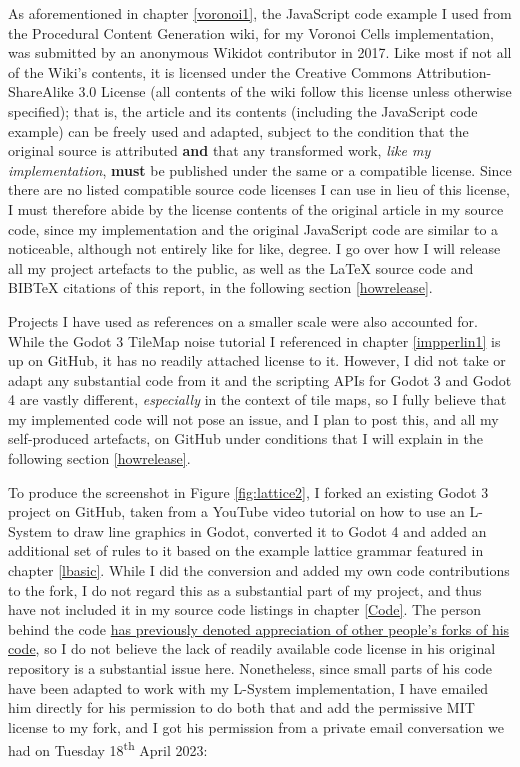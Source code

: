 As aforementioned in chapter \ref{voronoi1}, the JavaScript code example I used from the Procedural Content Generation wiki\cite{pcgwikivoronoi}, for my Voronoi Cells implementation, was submitted by an anonymous Wikidot contributor in 2017. Like most if not all of the Wiki's contents, it is licensed under the Creative Commons Attribution-ShareAlike 3.0 License (all contents of the wiki follow this license unless otherwise specified); that is, the article and its contents (including the JavaScript code example) can be freely used and adapted, subject to the condition that the original source is attributed \textbf{and} that any transformed work, \textit{like my implementation}, \textbf{must} be published under the same or a compatible license.\cite{cc_at_sa_3} Since there are no listed compatible source code licenses I can use in lieu of this license\cite{cc_compat}, I must therefore abide by the license contents of the original article in my source code, since my implementation and the original JavaScript code are similar to a noticeable, although not entirely like for like, degree. I go over how I will release all my project artefacts to the public, as well as the \LaTeX{} source code and BIB\TeX{} citations of this report, in the following section \ref{howrelease}.

Projects I have used as references on a smaller scale were also accounted for. While the Godot 3 TileMap noise tutorial I referenced in chapter \ref{impperlin1} is up on GitHub, it has no readily attached license to it.\cite{gingergd3tutorialGH} However, I did not take or adapt any substantial code from it and the scripting APIs for Godot 3 and Godot 4 are vastly different, \textit{especially} in the context of tile maps, so I fully believe that my implemented code will not pose an issue, and I plan to post this, and all my self-produced artefacts, on GitHub under conditions that I will explain in the following section \ref{howrelease}.

To produce the screenshot in Figure \ref{fig:lattice2}, I forked an existing Godot 3 project on GitHub\cite{codatGD3LSystemGH}, taken from a YouTube video tutorial on how to use an L-System to draw line graphics in Godot\cite{codatGD3LSystemYT}, converted it to Godot 4 and added an additional set of rules to it based on the example lattice grammar featured in chapter \ref{lbasic}.\cite{codatGD4LSystemGH} While I did the conversion and added my own code contributions to the fork, I do not regard this as a substantial part of my project, and thus have not included it in my source code listings in chapter \ref{Code}. The person behind the code \hyperlink{https://www.youtube.com/watch?v=eY9XkJERiG0&lc=UgwXjzr7jheuC9hH18h4AaABAg}{has previously denoted appreciation of other people's forks of his code}, so I do not believe the lack of readily available code license in his original repository is a substantial issue here. Nonetheless, since small parts of his code have been adapted to work with my L-System implementation, I have emailed him directly for his permission to do both that and add the permissive MIT license to my fork, and I got his permission from a private email conversation we had on Tuesday 18\textsuperscript{th} April 2023:

